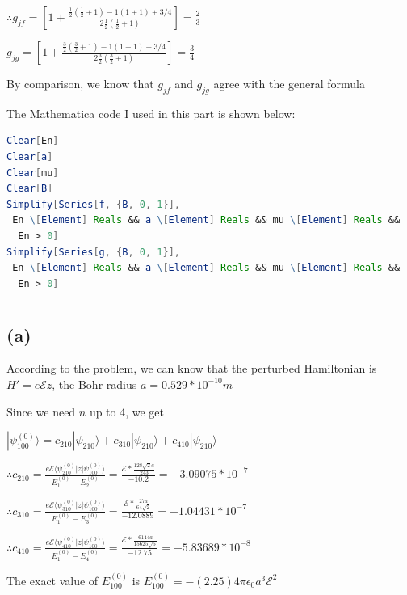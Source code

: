 \documentclass[12pt]{article}
\begin{document}
\begin{spacing}{2.0}
$\therefore g_{jf}=\left[ 1+ \frac{\frac{1}{2}(\frac{1}{2}+1)- 1(1+1)+3/4}{2\frac{1}{2}(\frac{1}{2}+1)} \right] = \frac{2}{3}$

$g_{jg}= \left[ 1+ \frac{\frac{3}{2}(\frac{3}{2}+1)- 1(1+1) +3/4}{2\frac{3}{2}(\frac{3}{2}+1)} \right]= \frac{3}{4}$

By comparison, we know that $g_{jf}$ and $g_{jg}$ agree with the general formula

The Mathematica code I used in this part is shown below:

\begin{lstlisting}[language=Mathematica,breaklines=true,frame=single]
Clear[En]
Clear[a]
Clear[mu]
Clear[B]
Simplify[Series[f, {B, 0, 1}],
 En \[Element] Reals && a \[Element] Reals && mu \[Element] Reals &&
  En > 0]
Simplify[Series[g, {B, 0, 1}],
 En \[Element] Reals && a \[Element] Reals && mu \[Element] Reals &&
  En > 0]
\end{lstlisting}


\section{} %

\subsection*{(a)}

According to the problem, we can know that the perturbed Hamiltonian is $H'= e\mathcal{E}z$, the Bohr radius $a=0.529*10^{-10} m$

Since we need $n$ up to 4, we get

$|\psi_{100}^{(0)} \rangle= c_{210}|\psi_{210}\rangle + c_{310}|\psi_{210}\rangle + c_{410}|\psi_{210}\rangle$

$\therefore c_{210}= \frac{e\mathcal{E} \langle \psi_{210}^{(0)}|z| \psi_{100}^{(0)} \rangle}{E_1^{(0)} -E_2^{(0)}}= \frac{\mathcal{E}*\frac{128 \sqrt{2} a}{243}}{-10.2}= -3.09075*10^{-7}$

$\therefore c_{310}= \frac{e\mathcal{E} \langle \psi_{310}^{(0)}|z| \psi_{100}^{(0)} \rangle}{E_1^{(0)} -E_3^{(0)}}= \frac{\mathcal{E}*\frac{27 a}{64 \sqrt{2}}}{-12.0889}= -1.04431*10^{-7}$

$\therefore c_{410}= \frac{e\mathcal{E} \langle \psi_{410}^{(0)}|z| \psi_{100}^{(0)} \rangle}{E_1^{(0)} -E_4^{(0)}}= \frac{\mathcal{E}*\frac{6144 a}{15625 \sqrt{5}}}{-12.75}= -5.83689*10^{-8}$

The exact value of $E_{100}^{(0)}$ is $E_{100}^{(0)}= -(2.25)4\pi \epsilon_0a^3\mathcal{E}^2$


\end{spacing}
\end{document}
